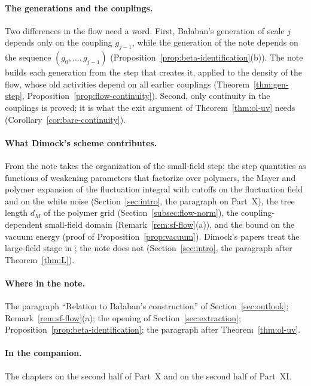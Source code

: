 \paragraph{The generations and the couplings.} Two differences in the flow need a word. First, Ba\l aban's generation of scale $j$ depends only on the coupling $g_{j-1}$, while the generation of the note depends on the sequence $(g_0,\dots,g_{j-1})$ (Proposition~\ref{prop:beta-identification}(b)). The note builds each generation from the step that creates it, applied to the density of the flow, whose old activities depend on all earlier couplings (Theorem~\ref{thm:gen-step}, Proposition~\ref{prop:flow-continuity}). Second, only continuity in the couplings is proved; it is what the exit argument of Theorem~\ref{thm:ol-uv} needs (Corollary~\ref{cor:bare-continuity}).

\paragraph{What Dimock's scheme contributes.} From \cite{DimockI} the note takes the organization of the small-field step: the step quantities as functions of weakening parameters that factorize over polymers, the Mayer and polymer expansion of the fluctuation integral with cutoffs on the fluctuation field and on the white noise (Section~\ref{sec:intro}, the paragraph on Part~X), the tree length $d_M$ of the polymer grid (Section~\ref{subsec:flow-norm}), the coupling-dependent small-field domain (Remark~\ref{rem:sf-flow}(a)), and the bound on the vacuum energy (proof of Proposition~\ref{prop:vacuum}). Dimock's papers treat the large-field stage in \cite{DimockII,DimockIII}; the note does not (Section~\ref{sec:intro}, the paragraph after Theorem~\ref{thm:L}).

\paragraph{Where in the note.} The paragraph ``Relation to Ba\l aban's construction'' of Section~\ref{sec:outlook}; Remark~\ref{rem:sf-flow}(a); the opening of Section~\ref{sec:extraction}; Proposition~\ref{prop:beta-identification}; the paragraph after Theorem~\ref{thm:ol-uv}.

\paragraph{In the companion.} The chapters on the second half of Part~X and on the second half of Part~XI.

